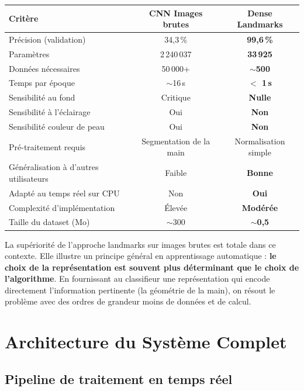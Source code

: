 \documentclass[12pt, a4paper]{article}
\begin{document}
\begin{center}
\begin{tabular}{@{}lcc@{}}
  \toprule
  \textbf{Critère} & \textbf{CNN Images brutes} & \textbf{Dense Landmarks} \\
  \midrule
  Précision (validation) & 34,3\,\% & \textbf{99,6\,\%} \\
  Paramètres & 2\,240\,037 & \textbf{33\,925} \\
  Données nécessaires & 50\,000+ & \textbf{\(\sim\)500} \\
  Temps par époque & \(\sim\)16\,s & \textbf{$<$ 1\,s} \\
  Sensibilité au fond & Critique & \textbf{Nulle} \\
  Sensibilité à l'éclairage & Oui & \textbf{Non} \\
  Sensibilité couleur de peau & Oui & \textbf{Non} \\
  Pré-traitement requis & Segmentation de la main & Normalisation simple \\
  Généralisation à d'autres utilisateurs & Faible & \textbf{Bonne} \\
  Adapté au temps réel sur CPU & Non & \textbf{Oui} \\
  Complexité d'implémentation & Élevée & \textbf{Modérée} \\
  Taille du dataset (Mo) & \(\sim\)300 & \textbf{\(\sim\)0,5} \\
  \bottomrule
\end{tabular}
\end{center}

La supériorité de l'approche landmarks sur images brutes est totale dans ce
contexte. Elle illustre un principe général en apprentissage automatique :
\textbf{le choix de la représentation est souvent plus déterminant que
le choix de l'algorithme}. En fournissant au classifieur une représentation
qui encode directement l'information pertinente (la géométrie de la main),
on résout le problème avec des ordres de grandeur moins de données et de calcul.

\section{Architecture du Système Complet}
\label{sec:architecture}

\subsection{Pipeline de traitement en temps réel}
\end{document}
